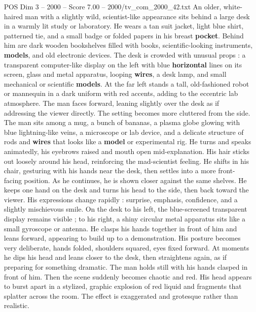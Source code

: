 \begin{textsample}{POS Dim 3 – 2000 – Score 7.00 – 2000/tv\_com\_2000\_42.txt}  \label{ex:f3_pos_064}
An older, white-haired man with a slightly wild, scientist-like appearance sits behind a large desk in a warmly lit study or laboratory.
He wears a tan suit jacket, light blue shirt, patterned tie, and a small badge or folded papers in his breast \textbf{pocket}.
Behind him are dark wooden bookshelves filled with books, scientific-looking instruments, \textbf{models}, and old electronic devices.
The desk is crowded with unusual props : a transparent computer-like display on the left with blue \textbf{horizontal} lines on its screen, glass and metal apparatus, looping \textbf{wires}, a desk lamp, and small mechanical or scientific \textbf{models}.
At the far left stands a tall, old-fashioned robot or mannequin in a dark uniform with red accents, adding to the eccentric lab atmosphere.
The man faces forward, leaning slightly over the desk as if addressing the viewer directly.
The setting becomes more cluttered from the side.
The man sits among a mug, a bunch of bananas, a plasma globe glowing with blue lightning-like veins, a microscope or lab device, and a delicate structure of rods and \textbf{wires} that looks like a \textbf{model} or experimental rig.
He turns and speaks animatedly, his eyebrows raised and mouth open mid-explanation.
His hair sticks out loosely around his head, reinforcing the mad-scientist feeling.
He shifts in his chair, gesturing with his hands near the desk, then settles into a more front-facing position.
As he continues, he is shown closer against the same shelves.
He keeps one hand on the desk and turns his head to the side, then back toward the viewer.
His expressions change rapidly : surprise, emphasis, confidence, and a slightly mischievous smile.
On the desk to his left, the blue-screened transparent display remains visible ; to his right, a shiny circular metal apparatus sits like a small gyroscope or antenna.
He clasps his hands together in front of him and leans forward, appearing to build up to a demonstration.
His posture becomes very deliberate, hands folded, shoulders squared, eyes fixed forward.
At moments he dips his head and leans closer to the desk, then straightens again, as if preparing for something dramatic.
The man holds still with his hands clasped in front of him.
Then the scene suddenly becomes chaotic and red.
His head appears to burst apart in a stylized, graphic explosion of red liquid and fragments that splatter across the room.
The effect is exaggerated and grotesque rather than realistic.

\end{textsample}
